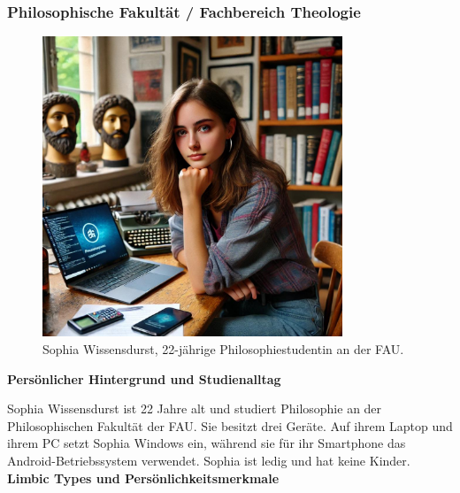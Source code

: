 \documentclass[german,report]{i1thesis}
\begin{document}
\subsubsection{Philosophische Fakultät / Fachbereich Theologie}

\begin{figure}[H]
\centering
\includegraphics[width=0.8\textwidth]{images/sophia_meier.pdf}
\caption{Sophia Wissensdurst, 22-jährige Philosophiestudentin an der FAU\cite{chatgpt2024sophiameier}.}
\label{fig}
\end{figure}

\textbf{Persönlicher Hintergrund und Studienalltag}

Sophia Wissensdurst ist 22 Jahre alt und studiert Philosophie an der Philosophischen Fakultät der FAU. Sie besitzt drei Geräte. Auf ihrem Laptop und ihrem PC setzt Sophia Windows ein, während sie für ihr Smartphone das Android-Betriebssystem verwendet. Sophia ist ledig und hat keine Kinder.\\

\textbf{Limbic Types und Persönlichkeitsmerkmale}
\end{document}
